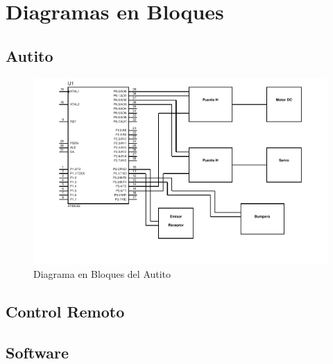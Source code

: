 \documentclass[a4paper,10pt]{article}
\begin{document}
	\section{Diagramas en Bloques}
		\subsection{Autito}
			\begin{figure}[!htb]
					\centering
					\includegraphics[width=13cm]{Imagenes/DiagramaAutito.pdf}
					\caption{Diagrama en Bloques del Autito} \label{img001}
				\end{figure}

		\subsection{Control Remoto}
		\subsection{Software}
\end{document}
